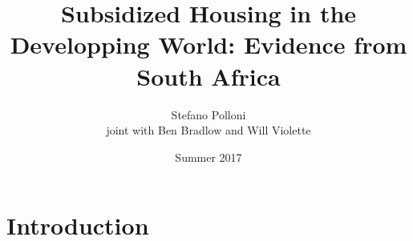 \documentclass[aspectratio=149]{beamer}
\title{ Subsidized Housing in the Developping World: Evidence from South Africa } %
\author{Stefano Polloni \\
joint with Ben Bradlow and Will Violette}
\date{Summer 2017} %
\begin{document}
\beamertemplatenavigationsymbolsempty

\begin{frame}
\titlepage %
\end{frame}


\section{Introduction}
\end{document}
